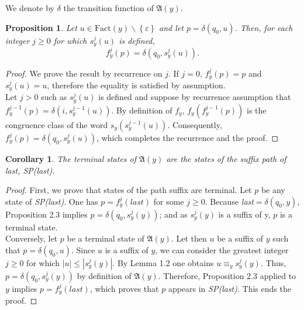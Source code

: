 \documentclass[11pt]{report}
\newtheorem{proposition}[theorem]{Proposition}
\newtheorem{corollary}[theorem]{Corollary}
\begin{document}
We denote by $\delta$ the transition function of $\mathfrak{A}(y)$.
\begin{proposition}
  Let $u \in \text{Fact}(y)\backslash\left\{\varepsilon\right\}$ and
  let $p = \delta(q_0,u)$. Then, for each integer $j \ge 0$ for which
  $s_y^j(u)$ is defined, $$f_y^j(p) = \delta(q_0,s_y^j(u)).$$
\end{proposition}
\begin{proof}
  We prove the result by recurrence on $j$. If $j = 0$, $f_y^j(p) = p$
  and $s_y^j(u) = u$, therefore the equality is satisfied by
  assumption.\\
Let $j > 0$ such as $s_y^j(u)$ is defined and suppose by recurrence
assumption that $f_y^{j-1}(p) = \delta(i,s_y^{j-1}(u))$. By definition
of $f_y$, $f_y(f_y^{j-1}(p))$ is the congruence class of the word
$s_y(s_y^{j-1}(u))$. Consequently, $f_y^j(p) = \delta(q_0,s_y^j(u))$,
which completes the recurrence and the proof.
\end{proof}
\begin{corollary}
  The terminal states of $\mathfrak{A}(y)$ are the states of the
  suffix path of last, SP(last).
\end{corollary}
\begin{proof}
  First, we prove that states of the path suffix are terminal. Let $p$
  be any state of \textit{SP(last)}. One has $p = f_y^j(last)$ for
  some $j \ge 0$. Because \textit{last}$=\delta(q_0,y)$, Proposition
  2.3 implies $p = \delta(q_0,s_y^j(y))$; and as $s_y^j(y)$ is a
  suffix of y, $p$ is a terminal state.\\
Conversely, let $p$ be a terminal state of $\mathfrak{A}(y)$. Let then
$u$ be a suffix of $y$ such that $p = \delta(q_0,u)$. Since $u$ is a
suffix of $y$, we can consider the greatest integer $j \ge 0$ for
which $|u| \le |s_y^j(y)|$. By Lemma 1.2 one obtains $u \equiv_y
s_y^j(y)$. Thus, $p = \delta(q_0, s_y^j(y))$ by definition of
$\mathfrak{A}(y)$. Therefore, Proposition 2.3 applied to $y$ implies
$p = f_y^j(\mathit{last})$, which proves that $p$ appears in
\textit{SP(last)}. This ends the proof.
\end{proof}
\end{document}
